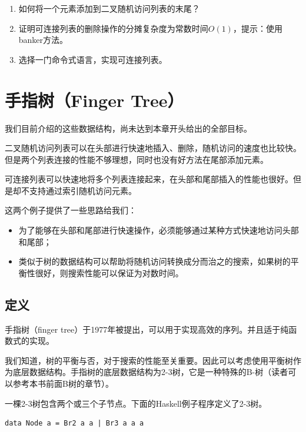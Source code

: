 \documentclass[b5paper]{ctexart}
\begin{document}
\begin{Exercise}
\begin{enumerate}
\item 如何将一个元素添加到二叉随机访问列表的末尾？

\item 证明可连接列表的删除操作的分摊复杂度为常数时间$O(1)$，提示：使用banker方法。

\item 选择一门命令式语言，实现可连接列表。
\end{enumerate}
\end{Exercise}

\section{手指树（Finger Tree）}
我们目前介绍的这些数据结构，尚未达到本章开头给出的全部目标。

二叉随机访问列表可以在头部进行快速地插入、删除，随机访问的速度也比较快。但是两个列表连接的性能不够理想，同时也没有好方法在尾部添加元素。

可连接列表可以快速地将多个列表连接起来，在头部和尾部插入的性能也很好。但是却不支持通过索引随机访问元素。

这两个例子提供了一些思路给我们：

\begin{itemize}
\item 为了能够在头部和尾部进行快速操作，必须能够通过某种方式快速地访问头部和尾部；
\item 类似于树的数据结构可以帮助将随机访问转换成分而治之的搜索，如果树的平衡性很好，则搜索性能可以保证为对数时间。
\end{itemize}

\subsection{定义}
手指树（finger tree）\cite{finger-tree-1977}于1977年被提出，可以用于实现高效的序列。并且适于纯函数式的实现\cite{finger-tree-2006}。

我们知道，树的平衡与否，对于搜索的性能至关重要。因此可以考虑使用平衡树作为底层数据结构。手指树的底层数据结构为2-3树，它是一种特殊的B-树（读者可以参考本书前面B树的章节）。

一棵2-3树包含两个或三个子节点。下面的Haskell例子程序定义了2-3树。

\lstset{language=Haskell}
\begin{lstlisting}[style=Haskell]
data Node a = Br2 a a | Br3 a a a
\end{lstlisting}
\end{document}
